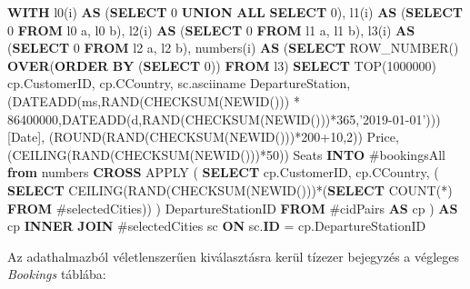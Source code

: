 \documentclass[
]{article}
\newenvironment{Shaded}{\begin{snugshade}}{\end{snugshade}}
\newcommand{\DataTypeTok}[1]{\textcolor[rgb]{0.56,0.13,0.00}{#1}}
\newcommand{\DecValTok}[1]{\textcolor[rgb]{0.25,0.63,0.44}{#1}}
\newcommand{\FunctionTok}[1]{\textcolor[rgb]{0.02,0.16,0.49}{#1}}
\newcommand{\KeywordTok}[1]{\textcolor[rgb]{0.00,0.44,0.13}{\textbf{#1}}}
\newcommand{\NormalTok}[1]{#1}
\newcommand{\OperatorTok}[1]{\textcolor[rgb]{0.40,0.40,0.40}{#1}}
\newcommand{\StringTok}[1]{\textcolor[rgb]{0.25,0.44,0.63}{#1}}
\begin{document}
\begin{Shaded}
\begin{Highlighting}[]
\KeywordTok{WITH}
\NormalTok{  l0(i) }\KeywordTok{AS}\NormalTok{ (}\KeywordTok{SELECT} \DecValTok{0} \KeywordTok{UNION} \KeywordTok{ALL} \KeywordTok{SELECT} \DecValTok{0}\NormalTok{),}
\NormalTok{  l1(i) }\KeywordTok{AS}\NormalTok{ (}\KeywordTok{SELECT} \DecValTok{0} \KeywordTok{FROM}\NormalTok{ l0 a, l0 b),}
\NormalTok{  l2(i) }\KeywordTok{AS}\NormalTok{ (}\KeywordTok{SELECT} \DecValTok{0} \KeywordTok{FROM}\NormalTok{ l1 a, l1 b),}
\NormalTok{  l3(i) }\KeywordTok{AS}\NormalTok{ (}\KeywordTok{SELECT} \DecValTok{0} \KeywordTok{FROM}\NormalTok{ l2 a, l2 b),}
\NormalTok{  numbers(i) }\KeywordTok{AS}\NormalTok{ (}\KeywordTok{SELECT} \FunctionTok{ROW_NUMBER}\NormalTok{() }\KeywordTok{OVER}\NormalTok{(}\KeywordTok{ORDER} \KeywordTok{BY}\NormalTok{ (}\KeywordTok{SELECT} \DecValTok{0}\NormalTok{)) }\KeywordTok{FROM}\NormalTok{ l3)}
\KeywordTok{SELECT}\NormalTok{ TOP(}\DecValTok{1000000}\NormalTok{)}
\NormalTok{    cp.CustomerID,}
\NormalTok{    cp.CCountry,}
\NormalTok{    sc.asciiname DepartureStation,}
\NormalTok{    (DATEADD(ms,RAND(CHECKSUM(NEWID())) }\OperatorTok{*} \DecValTok{86400000}\NormalTok{,DATEADD(d,RAND(CHECKSUM(NEWID()))}\OperatorTok{*}\DecValTok{365}\NormalTok{,}\StringTok{'2019-01-01'}\NormalTok{))) [}\DataTypeTok{Date}\NormalTok{],}
\NormalTok{    (}\FunctionTok{ROUND}\NormalTok{(RAND(CHECKSUM(NEWID()))}\OperatorTok{*}\DecValTok{200}\OperatorTok{+}\DecValTok{10}\NormalTok{,}\DecValTok{2}\NormalTok{)) Price,}
\NormalTok{    (CEILING(RAND(CHECKSUM(NEWID()))}\OperatorTok{*}\DecValTok{50}\NormalTok{)) Seats}
\KeywordTok{INTO}\NormalTok{ #bookingsAll}
\KeywordTok{from}\NormalTok{ numbers}
\KeywordTok{CROSS}\NormalTok{ APPLY (}
   \KeywordTok{SELECT} 
\NormalTok{    cp.CustomerID, }
\NormalTok{    cp.CCountry,}
\NormalTok{    (}
        \KeywordTok{SELECT}\NormalTok{ CEILING(RAND(CHECKSUM(NEWID()))}\OperatorTok{*}\NormalTok{(}\KeywordTok{SELECT} \FunctionTok{COUNT}\NormalTok{(}\OperatorTok{*}\NormalTok{) }
        \KeywordTok{FROM}\NormalTok{ #selectedCities))}
\NormalTok{    ) DepartureStationID}
    \KeywordTok{FROM}\NormalTok{ #cidPairs }\KeywordTok{AS}\NormalTok{ cp}
\NormalTok{) }\KeywordTok{AS}\NormalTok{ cp}
\KeywordTok{INNER} \KeywordTok{JOIN}\NormalTok{ #selectedCities sc }
    \KeywordTok{ON}\NormalTok{ sc.}\KeywordTok{ID} \OperatorTok{=}\NormalTok{ cp.DepartureStationID}
\end{Highlighting}
\end{Shaded}

Az adathalmazból véletlenszerűen kiválasztásra kerül tízezer bejegyzés a
végleges \emph{Bookings} táblába:
\end{document}
